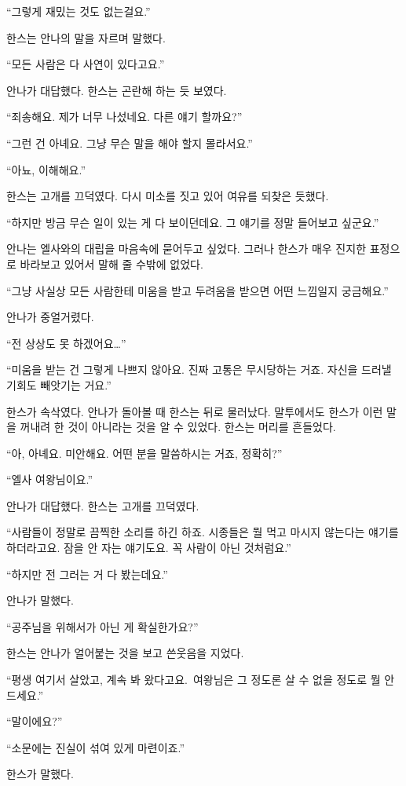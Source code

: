 ``그렇게 재밌는 것도 없는걸요.''

한스는 안나의 말을 자르며 말했다.

``모든 사람은 다 사연이 있다고요.''

안나가 대답했다. 한스는 곤란해 하는 듯 보였다.

``죄송해요. 제가 너무 나섰네요. 다른 얘기 할까요?''

``그런 건 아녜요. 그냥 무슨 말을 해야 할지 몰라서요.''

``아뇨, 이해해요.''

한스는 고개를 끄덕였다. 다시 미소를 짓고 있어 여유를 되찾은 듯했다.

``하지만 방금 무슨 일이 있는 게 다 보이던데요. 그 얘기를 정말 들어보고 싶군요.''

안나는 엘사와의 대립을 마음속에 묻어두고 싶었다. 그러나 한스가 매우 진지한 표정으로 바라보고 있어서 말해 줄 수밖에 없었다.

``그냥 사실상 모든 사람한테 미움을 받고 두려움을 받으면 어떤 느낌일지 궁금해요.''

안나가 중얼거렸다.

``전 상상도 못 하겠어요\ldots''

``미움을 받는 건 그렇게 나쁘지 않아요. 진짜 고통은 무시당하는 거죠. 자신을 드러낼 기회도 빼앗기는 거요.''

한스가 속삭였다. 안나가 돌아볼 때 한스는 뒤로 물러났다. 말투에서도 한스가 이런 말을 꺼내려 한 것이 아니라는 것을 알 수 있었다. 한스는 머리를 흔들었다.

``아, 아녜요. 미안해요. 어떤 분을 말씀하시는 거죠, 정확히?''

``엘사 여왕님이요.''

안나가 대답했다. 한스는 고개를 끄덕였다.

``사람들이 정말로 끔찍한 소리를 하긴 하죠. 시종들은 뭘 먹고 마시지 않는다는 얘기를 하더라고요. 잠을 안 자는 얘기도요. 꼭 사람이 아닌 것처럼요.''

``하지만 전 그러는 거 다 봤는데요.''

안나가 말했다.

``공주님을 위해서가 아닌 게 확실한가요?''

한스는 안나가 얼어붙는 것을 보고 쓴웃음을 지었다.

``평생 여기서 살았고, 계속 봐 왔다고요. 여왕님은 그 정도론 살 수 없을 정도로 뭘 안 드세요.''

`` 말이에요?''

``소문에는 진실이 섞여 있게 마련이죠.''

한스가 말했다.


